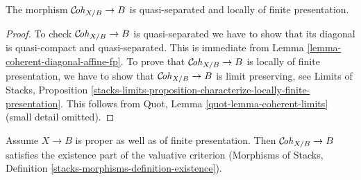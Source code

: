 \begin{lemma}
\label{lemma-coherent-qs-lfp}
The morphism $\mathcal{C}\!\mathit{oh}_{X/B} \to B$ is quasi-separated and
locally of finite presentation.
\end{lemma}

\begin{proof}
To check $\mathcal{C}\!\mathit{oh}_{X/B} \to B$ is quasi-separated we have to
show that its diagonal is quasi-compact and quasi-separated.
This is immediate from Lemma \ref{lemma-coherent-diagonal-affine-fp}.
To prove that $\mathcal{C}\!\mathit{oh}_{X/B} \to B$ is locally of finite
presentation, we have to show that $\mathcal{C}\!\mathit{oh}_{X/B} \to B$
is limit preserving, see
Limits of Stacks, Proposition
\ref{stacks-limits-proposition-characterize-locally-finite-presentation}.
This follows from Quot, Lemma \ref{quot-lemma-coherent-limits}
(small detail omitted).
\end{proof}

\begin{lemma}
\label{lemma-coherent-existence-part}
Assume $X \to B$ is proper as well as of finite presentation.
Then $\mathcal{C}\!\mathit{oh}_{X/B} \to B$ satisfies the existence part
of the valuative criterion (Morphisms of Stacks, Definition
\ref{stacks-morphisms-definition-existence}).
\end{lemma}

